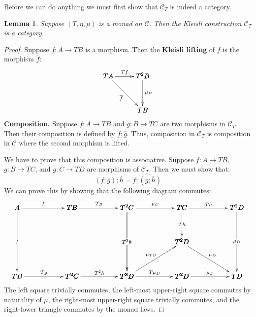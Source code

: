 \documentclass{article}
\let\mto\to
\let\to\relax
\newcommand{\to}{\rightarrow}
\newcommand{\cat}[1]{\mathcal{#1}}
\newtheorem{lemma}[theorem]{Lemma}
\begin{document}
Before we can do anything we must first show that $\cat{C}_T$ is
indeed a category.
\begin{lemma}
  \label{lemma:Kleisli_is_a_category}
  Suppose $(T,\eta,\mu)$ is a monad on $\cat{C}$.  Then the Kleisli
  construction $\cat{C}_T$ is a category.
\end{lemma}
\begin{proof}
  Suppose $f : A \mto TB$ is a morphism.  Then the \textbf{Kleisli
    lifting} of $f$ is the morphism $\overline{f}$:
  \[ 
  \bfig
  \qtriangle[
    TA`
    T^2B`
    TB;
    Tf`
    \overline{f}`
    \mu_B]
  \efig
  \]
  \noindent
  \textbf{Composition.} Suppose $f : A \mto TB$ and $g : B \mto TC$
  are two morphisms in $\cat{C}_T$.  Then their composition is defined
  by $f;\overline{g}$.  Thus, composition in $\cat{C}_T$ is composition in
  $\cat{C}$ where the second morphism is lifted.

  We have to prove that this composition is associative.  Suppose
  $f : A \mto TB$, $g : B \mto TC$, and $g : C \mto TD$ are morphisms
  of $\cat{C}_T$.  Then we must show that:
  \[
  (f;\overline{g});\overline{h} = f;\overline{(g;\overline{h})}
  \]  
  We can prove this by showing that the following diagram commutes:
  \[
  \bfig
  \square|amma|/->`->``->/<800,1000>[
    A`
    TB`
    TB`
    T^2C;
    f`
    f``
    Tg]
  \square(800,0)|amma|/->``->`->/<800,1000>[
    TB`
    T^2C`
    T^2C`
    T^3D;
    Tg``
    T^2h`
    T^2h]
  \square(1600,0)|amma|/->`->``->/<800,1000>[
    T^2C`
    TC`
    T^3D`
    T^2D;
    \mu_C`
    T^2h``
    T\mu_D]
  \square(2400,0)|amma|/->``->`->/<800,1000>[
    TC`
    T^2D`
    T^2D`
    TD;
    Th``
    \mu_D`
    \mu_D]
  \Atriangle(1600,0)/<-`->`/<800,500>[
    T^2D`
    T^3D`
    TD;
    \mu_{TD}`
    \mu_D`]
  \morphism(2400,1000)|m|<0,-500>[
    TC`
    T^2D;
    Th]
  \efig
  \]
  The left square trivially commutes, the left-most upper-right square
  commutes by naturality of $\mu$, the right-most upper-right square
  trivially commutes, and the right-lower triangle commutes by the
  monad laws.


\end{proof}
\end{document}
